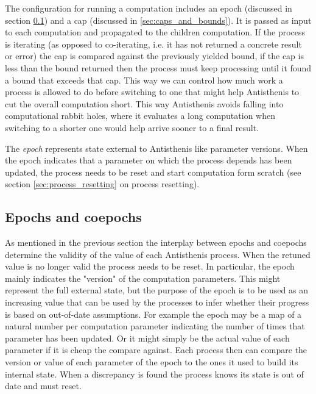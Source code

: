 The configuration for running a computation includes an epoch
(discussed in section \ref{sec:epochs_coepochs}) and a cap (discussed
in \ref{sec:caps_and_bounds}). It is passed as input to each
computation and propagated to the children computation. If the process
is iterating (as opposed to co-iterating, i.e. it has not returned a
concrete result or error) the cap is compared against the previously
yielded bound, if the cap is less than the bound returned then the
process must keep processing until it found a bound that exceeds that
cap. This way we can control how much work a process is allowed to do
before switching to one that might help Antisthenis to cut the overall
computation short. This way Antisthenis avoids falling into
computational rabbit holes, where it evaluates a long computation when
switching to a shorter one would help arrive sooner to a final result.

The \emph{epoch} represents state external to Antisthenis like
parameter versions. When the epoch indicates that a parameter on which
the process depends has been updated, the process needs to be reset
and start computation form scratch (see section
\ref{sec:process_resetting} on process resetting).


\subsection{Epochs and coepochs}
\label{sec:epochs_coepochs}

As mentioned in the previous section the interplay between epochs and
coepochs determine the validity of the value of each Antisthenis
process. When the retuned value is no longer valid the process needs
to be reset. In particular, the epoch mainly indicates the "version"
of the computation parameters. This might represent the full external
state, but the purpose of the epoch is to be used as an increasing
value that can be used by the processes to infer whether their
progress is based on out-of-date assumptions. For example the epoch
may be a map of a natural number per computation parameter indicating
the number of times that parameter has been updated. Or it might
simply be the actual value of each parameter if it is cheap the
compare against. Each process then can compare the version or value of
each parameter of the epoch to the ones it used to build its internal
state. When a discrepancy is found the process knows its state is out
of date and must reset.

